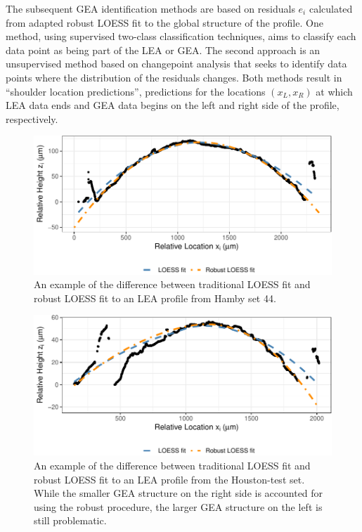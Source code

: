 \documentclass[12pt]{article}
\begin{document}
The subsequent GEA identification methods are based on residuals \(e_i\)
calculated from adapted robust LOESS fit to the global structure of the
profile. One method, using supervised two-class classification
techniques, aims to classify each data point as being part of the LEA or
GEA. The second approach is an unsupervised method based on changepoint
analysis that seeks to identify data points where the distribution of
the residuals changes. Both methods result in ``shoulder location
predictions'', predictions for the locations \((x_L, x_R)\) at which LEA
data ends and GEA data begins on the left and right side of the profile,
respectively.

\begin{figure}
\centering
\includegraphics{writeup_files/figure-latex/loess-vs-locfit-1.pdf}
\caption{\label{loess-vs-locfit}An example of the difference between
traditional LOESS fit and robust LOESS fit to an LEA profile from Hamby
set 44.}
\end{figure}

\begin{figure}
\centering
\includegraphics{writeup_files/figure-latex/houston-locfit-1.pdf}
\caption{\label{houston-locfit}An example of the difference between
traditional LOESS fit and robust LOESS fit to an LEA profile from the
Houston-test set. While the smaller GEA structure on the right side is
accounted for using the robust procedure, the larger GEA structure on
the left is still problematic.}
\end{figure}
\end{document}
